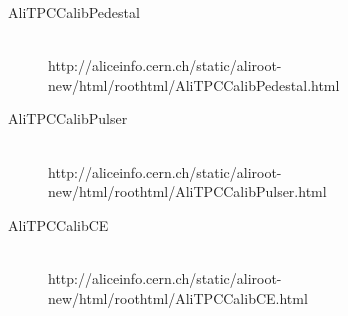 \documentclass[a4paper,12pt]{article}
\begin{document}
\begin{description}
 \item[AliTPCCalibPedestal]\mbox{}\\ 
  http://aliceinfo.cern.ch/static/aliroot-new/html/roothtml/AliTPCCalibPedestal.html
 \item[AliTPCCalibPulser] \mbox{}\\
  http://aliceinfo.cern.ch/static/aliroot-new/html/roothtml/AliTPCCalibPulser.html
 \item[AliTPCCalibCE] \mbox{}\\
  http://aliceinfo.cern.ch/static/aliroot-new/html/roothtml/AliTPCCalibCE.html
\end{description}
\end{document}
